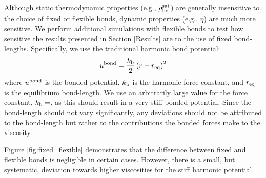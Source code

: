\documentclass[preprint,review,12pt]{elsarticle}
\begin{document}
    Although static thermodynamic properties (e.g., $\rho_{\rm liq}^{\rm sat}$) are generally insensitive to the choice of fixed or flexible bonds, dynamic properties (e.g., $\eta$) are much more sensitive. We perform additional simulations with flexible bonds to test how sensitive the results presented in Section \ref{Results} are to the use of fixed bond-lengths. Specifically, we use the traditional harmonic bond potential:
    \begin{equation} \label{eq:harmonic_bond}
    u^{\rm bond} = \frac{k_{\rm b}}{2} \left(r-r_{\rm eq}\right)^2
    \end{equation}
    where $u^{\rm bond}$ is the bonded potential, $k_{\rm b}$ is the harmonic force constant, and $r_{\rm eq}$ is the equilibrium bond-length. We use an arbitrarily large value for the force constant, $k_{\rm b} = $, as this should result in a very stiff bonded potential. Since the bond-length should not vary significantly, any deviations should not be attributed to the bond-length but rather to the contributions the bonded forces make to the viscosity. 
    
    Figure \ref{fig:fixed_flexible} demonstrates that the difference between fixed and flexible bonds is negligible in certain cases. However, there is a small, but systematic, deviation towards higher viscosities for the stiff harmonic potential. 
    
\end{document}
